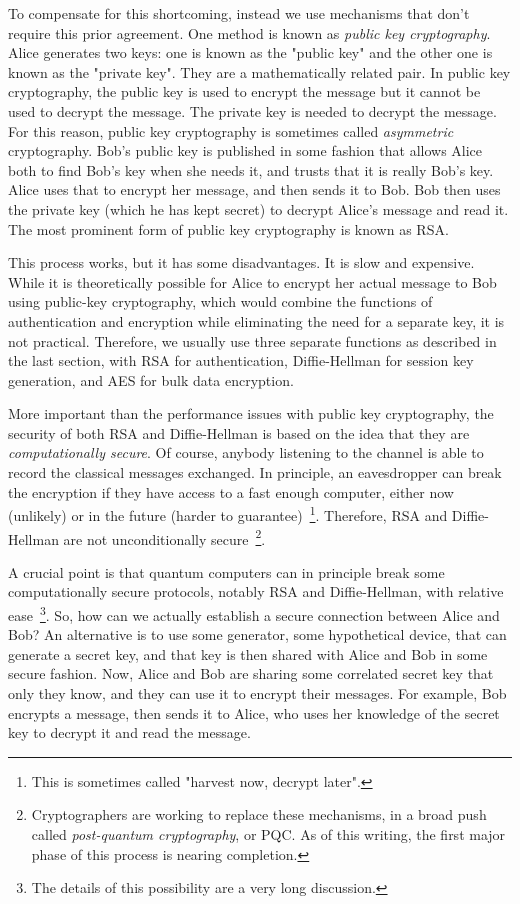 To compensate for this shortcoming, instead we use mechanisms that don't require this prior agreement. One method is known as \emph{public key cryptography}. Alice generates two keys: one is known as the "public key" and the other one is known as the "private key".  They are a mathematically related pair.  In public key cryptography, the public key is used to encrypt the message but it cannot be used to decrypt the message. 
The private key is needed to decrypt the message.  For this reason, public key cryptography is sometimes called \emph{asymmetric} cryptography.  Bob's public key is published in some fashion that allows Alice both to find Bob's key when she needs it, and trusts that it is really Bob's key.  Alice uses that to encrypt her message, and then sends it to Bob. Bob then uses the private key (which he has kept secret) to decrypt Alice's message and read it.  The most prominent form of public key cryptography is known as RSA.

This process works, but it has some disadvantages. It is slow and expensive. While it is theoretically possible for Alice to encrypt her actual message to Bob using public-key cryptography, which would combine the functions of authentication and encryption while eliminating the need for a separate key, it is not practical.  Therefore, we usually use three separate functions as described in the last section, with RSA for authentication, Diffie-Hellman for session key generation, and AES for bulk data encryption.

More important than the performance issues with public key cryptography, the security of both RSA and Diffie-Hellman is based on the idea that they are \emph{computationally secure}.  Of course, anybody listening to the channel is able to record the classical messages exchanged. In principle, an eavesdropper can break the encryption if they have access to a fast enough computer, either now (unlikely) or in the future (harder to guarantee)~\footnote{This is sometimes called "harvest now, decrypt later".}.  Therefore, RSA and Diffie-Hellman are not unconditionally secure~\footnote{Cryptographers are working to replace these mechanisms, in a broad push called \emph{post-quantum cryptography}, or PQC.  As of this writing, the first major phase of this process is nearing completion.}.

A crucial point is that quantum computers can in principle break some computationally secure protocols, notably RSA and Diffie-Hellman, with relative ease~\footnote{The details of this possibility are a very long discussion.}. So, how can we actually establish a secure connection between Alice and Bob? An alternative is to use some generator, some hypothetical device, that can generate a secret key, and that key is then shared with Alice and Bob in some secure fashion. Now, Alice and Bob are sharing some correlated secret key that only they know, and they can use it to encrypt their messages. For example, Bob encrypts a message, then sends it to Alice, who uses her knowledge of the secret key to decrypt it and read the message.

